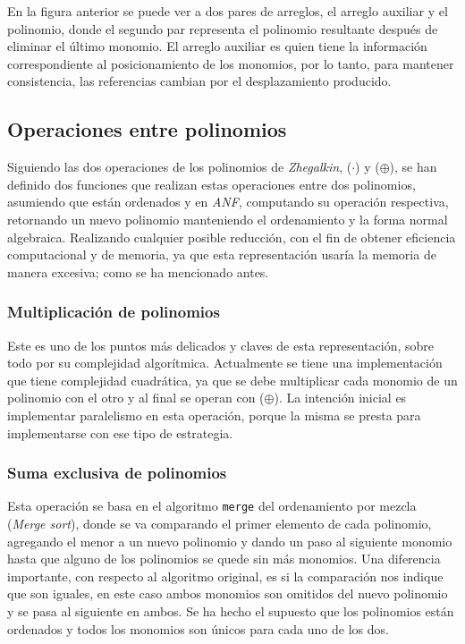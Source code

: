 En la figura anterior se puede ver a dos pares de arreglos, el arreglo auxiliar y el polinomio, donde el segundo par representa el polinomio resultante después de eliminar el último monomio. El arreglo auxiliar es quien tiene la información correspondiente al posicionamiento de los monomios, por lo tanto, para mantener consistencia, las referencias cambian por el desplazamiento producido.

\subsection{Operaciones entre polinomios}

Siguiendo las dos operaciones de los polinomios de \textit{Zhegalkin}, ($\cdot$) y ($\oplus$), se han definido dos funciones que realizan estas operaciones entre dos polinomios, asumiendo que están ordenados y en \textit{ANF}, computando su operación respectiva, retornando un nuevo polinomio manteniendo el ordenamiento y la forma normal algebraica. Realizando cualquier posible reducción, con el fin de obtener eficiencia computacional y de memoria, ya que esta representación usaría la memoria de manera excesiva; como se ha mencionado antes.

\subsubsection{Multiplicación de polinomios}

Este es uno de los puntos más delicados y claves de esta representación, sobre todo por su complejidad algorítmica. Actualmente se tiene una implementación que tiene complejidad cuadrática, ya que se debe multiplicar cada monomio de un polinomio con el otro y al final se operan con ($\oplus$). La intención inicial es implementar paralelismo en esta operación, porque la misma se presta para implementarse con ese tipo de estrategia.

\subsubsection{Suma exclusiva de polinomios}

Esta operación se basa en el algoritmo \texttt{merge} del ordenamiento por mezcla (\textit{Merge sort}), donde se va comparando el primer elemento de cada polinomio, agregando el menor a un nuevo polinomio y dando un paso al siguiente monomio hasta que alguno de los polinomios se quede sin más monomios. Una diferencia importante, con respecto al algoritmo original, es si la comparación nos indique que son iguales, en este caso ambos monomios son omitidos del nuevo polinomio y se pasa al siguiente en ambos. Se ha hecho el supuesto que los polinomios están ordenados y todos los monomios son únicos para cada uno de los dos.

